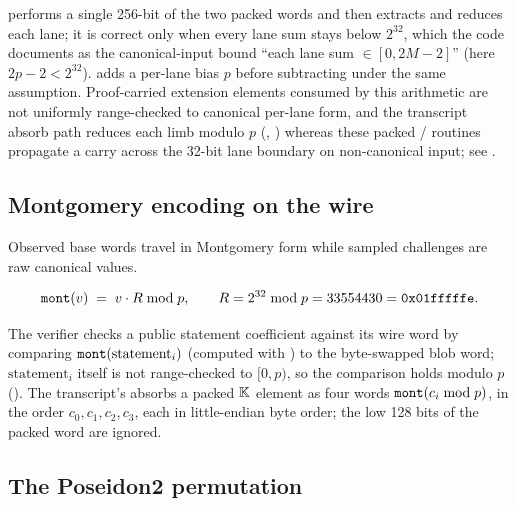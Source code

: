 \begin{property}
\label{prop:ext-lanes}
 performs a single 256-bit  of the two packed
words and then extracts and reduces each lane; it is correct only when every lane
sum stays below $2^{32}$, which the code documents as the canonical-input bound
``each lane sum $\in [0,2M-2]$'' (here $2p-2 < 2^{32}$).  adds a per-lane
bias $p$ before subtracting under the same assumption.
Proof-carried extension elements consumed by this arithmetic are not uniformly
range-checked to canonical per-lane form, and the transcript absorb path reduces
each limb modulo $p$ (, )
whereas these packed / routines propagate a carry across the
32-bit lane boundary on non-canonical input; see .
\end{property}

\subsection{Montgomery encoding on the wire}

Observed base words travel in Montgomery form while sampled challenges are raw
canonical values.
\begin{definition}
\[
  \texttt{mont}(v) \;=\; v \cdot R \bmod p, \qquad R = 2^{32} \bmod p = 33554430 = \texttt{0x01fffffe}.
\]
\end{definition}
The verifier checks a public statement coefficient against its wire word by
comparing $\texttt{mont}(\text{statement}_i)$ (computed with ) to the
byte-swapped blob word; $\text{statement}_i$ itself is not range-checked to $[0,p)$,
so the comparison holds modulo $p$ ().
The transcript's  absorbs a packed $\mathbb{K}$ element as four
words $\texttt{mont}(c_i \bmod p)$, in the order $c_0,c_1,c_2,c_3$, each in
little-endian byte order; the low 128 bits of the packed word are ignored.

\subsection{The Poseidon2 permutation}

